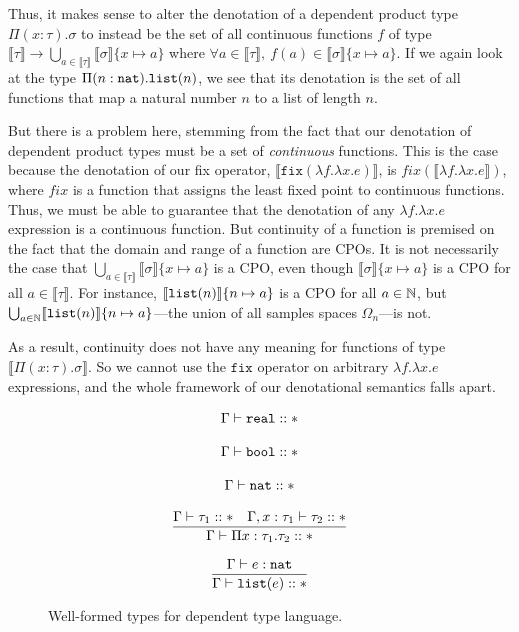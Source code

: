Thus, it makes sense to alter the denotation of a dependent product type $\Pi(x:\tau).\sigma$ to instead be the set of all
continuous functions $f$ 
of type $\llbracket \tau \rrbracket \rightarrow \bigcup_{a \in \llbracket \tau \rrbracket} \llbracket \sigma \rrbracket\{x \mapsto a\}$
where $\forall a \in \llbracket \tau \rrbracket, \ f(a) \in \llbracket \sigma \rrbracket\{x \mapsto a\}$. If we again look at the 
type $\Pi(n:\texttt{nat}).\texttt{list}(n)$, we see that its denotation is the set of all functions that map a natural number $n$ 
to a list of length $n$.

But there is a problem here, stemming from the fact that our denotation of dependent product types must be a 
set of \emph{continuous} functions. This is the case because the denotation of our fix operator,
$\llbracket \texttt{fix}(\lambda f. \lambda x.e) \rrbracket$, is $fix(\llbracket \lambda f. \lambda x.e \rrbracket)$, where $fix$ 
is a function that assigns the least fixed point to continuous functions. Thus, we must be able to guarantee that the denotation of any $\lambda f. \lambda x.e$ expression is a continuous function. But continuity of a function is premised on the fact that the domain and range of
a function are CPOs. It is not necessarily the case that
 $\bigcup_{a \in \llbracket \tau \rrbracket} \llbracket \sigma \rrbracket\{ x \mapsto a\}$ is a CPO, even though 
 $\llbracket \sigma \rrbracket\{x\mapsto a\}$ is a CPO for all $a \in \llbracket \tau \rrbracket$.
 For instance, $\llbracket \texttt{list}(n) \rrbracket\{n \mapsto a\}$ is a CPO for all $a \in \mathbb{N}$, but 
 $\bigcup_{a \in \mathbb{N}} \llbracket\texttt{list}(n)\rrbracket\{n \mapsto a\}$---the union of all samples spaces $\Omega_n$---is not. 

As a result, continuity does not have any meaning for functions of type $\llbracket \Pi (x: \tau).\sigma \rrbracket$. 
So we cannot use the $\texttt{fix}$ operator on arbitrary $\lambda f. \lambda x.e$ expressions, and the whole
framework of our denotational semantics falls apart. 
 
 \begin{figure}
\[
\begin{array}{c}
\Gamma \vdash \texttt{real} :: * \\ \\
\Gamma \vdash \texttt{bool} :: *\\ \\
\Gamma \vdash \texttt{nat} :: * \\ \\ 
\dfrac{\Gamma \vdash \tau_1 :: * \ \ \ \Gamma, x:\tau_1 \vdash \tau_2 :: *}{\Gamma \vdash \Pi x:\tau_1.\tau_2 :: *} \\ \\
\dfrac{\Gamma \vdash e : \texttt{nat}}{\Gamma \vdash \texttt{list}(e) :: *} 
\end{array}
\]
\caption{Well-formed types for dependent type language.}
\end{figure}

